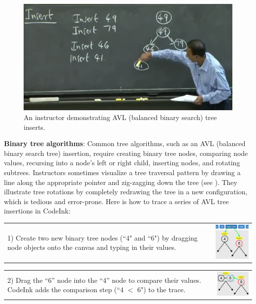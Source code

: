 \begin{figure}

\begin{center}
\includegraphics[width=0.7\columnwidth]{img/6006/bst.png}
\end{center}

\caption{An instructor demonstrating AVL (balanced binary search) tree
inserts.}

\label{fig:example-bst}
\end{figure}


\noindent \textbf{Binary tree algorithms}:
Common tree algorithms, such as an AVL (balanced binary search tree) insertion,
require creating binary tree nodes, comparing node values, recursing into a
node's left or right child, inserting nodes, and rotating subtrees. Instructors
sometimes visualize a tree traversal pattern by drawing a line along the
appropriate pointer and zig-zagging down the tree (see ). They illustrate tree rotations by completely redrawing
the tree in a new configuration, which is tedious and error-prone. Here is how
to trace a series of AVL tree insertions in CodeInk:

\noindent \begin{tabular}{m{4.6cm} m{3.4cm}}

1) Create two new binary tree nodes (``4" and ``6") by dragging node
objects onto the canvas and typing in their values.

& \includegraphics[width=3.4cm]{img/examples/bst-1.png}
\end{tabular}


\noindent \begin{tabular}{m{4.6cm} m{3.4cm}}

2) Drag the ``6'' node into the ``4'' node to compare their values.
CodeInk adds the comparison step (``4 $<$ 6") to the trace.

& \includegraphics[width=3.4cm]{img/examples/bst-2.png}
\end{tabular}


